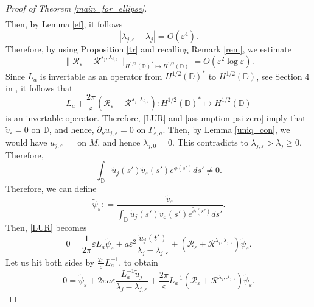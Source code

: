 \documentclass[12pt,a4paper]{amsart}
\numberwithin{equation}{section}
\theoremstyle{plain}
\theoremstyle{definition}
\begin{document}
\begin{proof}[Proof of Theorem \ref{main_for_ellipse}]
\begin{multline*}
	\end{multline*}
	Then, by Lemma \ref{ef}, it follows 
	\begin{equation*}
		|\lambda_{j,\varepsilon} -  \lambda_j| = O(\varepsilon^4).
	\end{equation*}
	Therefore, by using Proposition \ref{tr} and recalling Remark \ref{rem}, we estimate
	\begin{equation*}
		\|\mathcal{R}_\varepsilon + \mathcal{R}^{\lambda_j,\lambda_{j,\varepsilon}}\|_{H^{1/2}(\mathbb{D})^* \mapsto H^{1/2}(\mathbb{D})} = O(\varepsilon^2\log\varepsilon).
	\end{equation*}
	Since  $L_a$ is invertable as an operator from $H^{1/2}(\mathbb{D})^*$ to $H^{1/2}(\mathbb{D})$, see Section 4 in \cite{NursultanovTzouTzou}, it follows that
	\begin{equation*}
		L_a + \frac{2\pi}{\varepsilon}\left( \mathcal{R}_\varepsilon + \mathcal{R}^{\lambda_j,\lambda_{j,\varepsilon}}\right): H^{1/2}(\mathbb{D})^* \mapsto H^{1/2}(\mathbb{D})
	\end{equation*}
	is an invertable operator. Therefore, \eqref{LUR} and \eqref{assumption psi zero} imply that $\tilde{v}_\varepsilon = 0$ on $\mathbb{D}$, and hence, $\partial_{\nu} u_{j,\varepsilon} = 0$ on $\Gamma_{\varepsilon, a}$. Then, by Lemma \ref{uniq_con}, we would have $u_{j,\varepsilon} = $ on $M$, and hence $\lambda_{j,0} = 0$. This contradicts to $\lambda_{j,\varepsilon}>\lambda_j\geq 0$. Therefore,
	\begin{equation*}
		\int_{\mathbb{D}} \tilde{u}_j(s')\tilde{v}_\varepsilon(s')e^{\tilde{\phi}(s')}ds' \neq 0.
	\end{equation*}
	Therefore, we can define
	\begin{equation*}
		\tilde{\psi}_\varepsilon : = \frac{\tilde{v}_\varepsilon}{\int_{\mathbb{D}} \tilde{u}_j(s')\tilde{v}_\varepsilon(s')e^{\tilde{\phi}(s')}ds'}.
	\end{equation*}
	Then, \eqref{LUR} becomes
	\begin{equation*}
		0 = \frac{1}{2\pi} \varepsilon L_a\tilde{\psi}_\varepsilon + a\varepsilon^2\frac{\tilde{u}_j(t')}{\lambda_j - \lambda_{j,\varepsilon}}  + \left(\mathcal{R}_\varepsilon + \mathcal{R}^{\lambda_j,\lambda_{j,\varepsilon}} \right)\tilde{\psi}_\varepsilon.
	\end{equation*}
	Let us hit both sides by $\frac{2\pi}{\varepsilon} L_a^{-1}$, to obtain
	\begin{equation}\label{exp_for_psi_tilde}
		0 = \tilde{\psi}_{\varepsilon} + 2\pi a\varepsilon\frac{L_{a}^{-1}\tilde{u}_j}{\lambda_j - \lambda_{j,\varepsilon}}  + \frac{2\pi}{\varepsilon}L_{a}^{-1}\left( \mathcal{R}_\varepsilon + \mathcal{R}^{\lambda_j,\lambda_{j,\varepsilon}}\right) \tilde{\psi}_\varepsilon.

\end{equation}
\end{proof}
\end{document}

